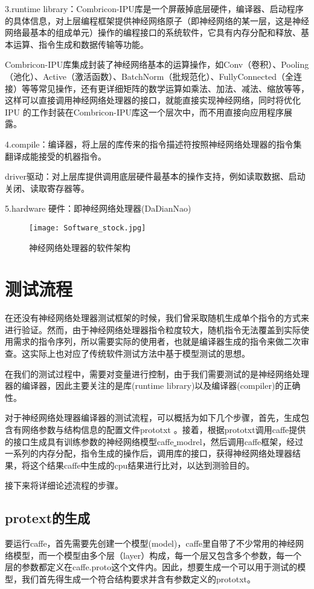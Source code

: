 3.runtime library：Combricon-IPU库是一个屏蔽掉底层硬件，编译器、启动程序的具体信息，对上层编程框架提供神经网络原子（即神经网络的某一层，这是神经网络最基本的组成单元）操作的编程接口的系统软件，它具有内存分配和释放、基本运算、指令生成和数据传输等功能。

Combricon-IPU库集成封装了神经网络基本的运算操作，如Conv（卷积）、Pooling（池化）、Active（激活函数）、BatchNorm（批规范化）、FullyConnected（全连接）等等常见操作，还有更详细矩阵的数学运算如乘法、加法、减法、缩放等等，这样可以直接调用神经网络处理器的接口，就能直接实现神经网络，同时将优化IPU 的工作封装在Combricon-IPU库这一个层次中，而不用直接向应用程序展露。

4.compile：编译器，将上层的库传来的指令描述符按照神经网络处理器的指令集翻译成能接受的机器指令。

driver驱动：对上层库提供调用底层硬件最基本的操作支持，例如读取数据、启动关闭、读取寄存器等。

5.hardware 硬件：即神经网络处理器(DaDianNao)

\begin{figure}[!htbp]
\centering
\texttt{[image: Software\_stock.jpg]}
\caption{神经网络处理器的软件架构}
\label{fig:Software stock}
\end{figure}

\section{测试流程}
在还没有神经网络处理器测试框架的时候，我们曾采取随机生成单个指令的方式来进行验证。然而，由于神经网络处理器指令粒度较大，随机指令无法覆盖到实际使用需求的指令序列，所以需要实际的使用者，也就是编译器生成的指令来做二次审查。这实际上也对应了传统软件测试方法中基于模型测试的思想。

在我们的测试过程中，需要对变量进行控制，由于我们需要测试的是神经网络处理器的编译器，因此主要关注的是库(runtime library)以及编译器(compiler)的正确性。

对于神经网络处理器编译器的测试流程，可以概括为如下几个步骤，首先，生成包含有网络参数与结构信息的配置文件prototxt 。接着，根据prototxt调用caffe提供的接口生成具有训练参数的神经网络模型caffe\underline{ }modrel，然后调用caffe框架，经过一系列的内存分配，指令生成的操作后，调用库的接口，获得神经网络处理器结果，将这个结果caffe中生成的cpu结果进行比对，以达到测验目的。

接下来将详细论述流程的步骤。
\subsection{protext的生成}
要运行caffe，首先需要先创建一个模型(model)，caffe里自带了不少常用的神经网络模型，而一个模型由多个层（layer）构成，每一个层又包含多个参数，每一个层的参数都定义在caffe.proto这个文件内。因此，想要生成一个可以用于测试的模型，我们首先得生成一个符合结构要求并含有参数定义的prototxt。

